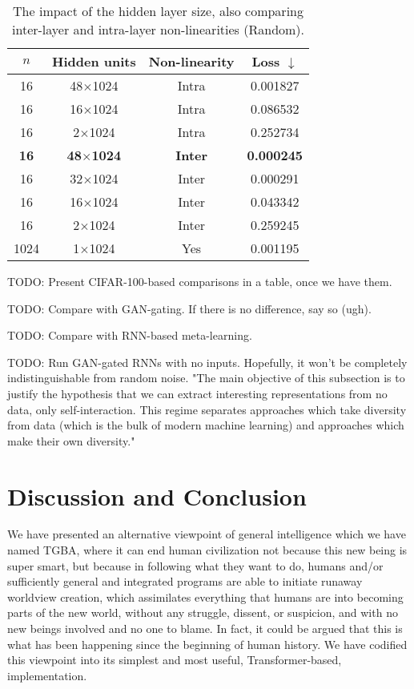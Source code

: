 \documentclass{article}
\begin{document}
\begin{table}
\begin{center}
\begin{tabular}{cccc}
\hline
$n$ & Hidden units & Non-linearity & Loss $\downarrow$ \\
\hline
16 & 48$\times$1024 & Intra & 0.001827 \\
16 & 16$\times$1024 & Intra & 0.086532 \\
16 & 2$\times$1024 & Intra & 0.252734 \\
\hline
\textbf{16} & \textbf{48$\times$1024} & \textbf{Inter} & \textbf{0.000245} \\
16 & 32$\times$1024 & Inter & 0.000291 \\
16 & 16$\times$1024 & Inter & 0.043342 \\
16 & 2$\times$1024 & Inter & 0.259245 \\
\hline
1024 & 1$\times$1024 & Yes & 0.001195 \\
\hline
\end{tabular}
\end{center}
\caption{The impact of the hidden layer size, also comparing inter-layer and intra-layer non-linearities (Random).}
\label{LDLscaling}
\end{table}

    TODO: Present CIFAR-100-based comparisons in a table, once we have them.

    TODO: Compare with GAN-gating. If there is no difference, say so (ugh).

    TODO: Compare with RNN-based meta-learning.

    TODO: Run GAN-gated RNNs with no inputs. Hopefully, it won't be completely indistinguishable from random noise. "The main objective of this subsection is to justify the hypothesis that we can extract interesting representations from no data, only self-interaction. This regime separates approaches which take diversity from data (which is the bulk of modern machine learning) and approaches which make their own diversity."

\section{Discussion and Conclusion}

We have presented an alternative viewpoint of general intelligence which we have named TGBA, where it can end human civilization not because this new being is super smart, but because in following what they want to do, humans and/or sufficiently general and integrated programs are able to initiate runaway worldview creation, which assimilates everything that humans are into becoming parts of the new world, without any struggle, dissent, or suspicion, and with no new beings involved and no one to blame. In fact, it could be argued that this is what has been happening since the beginning of human history. We have codified this viewpoint into its simplest and most useful, Transformer-based, implementation.
\end{document}
